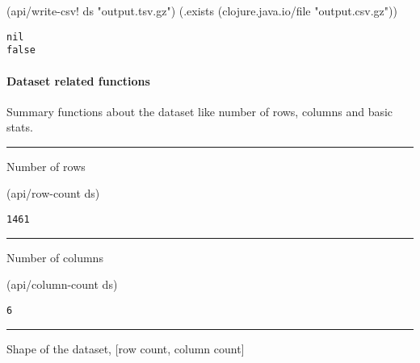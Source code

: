 \documentclass[]{article}
\newenvironment{Shaded}{\begin{snugshade}}{\end{snugshade}}
\newcommand{\StringTok}[1]{\textcolor[rgb]{0.31,0.60,0.02}{#1}}
\newcommand{\NormalTok}[1]{#1}
\let\oldparagraph\paragraph
\renewcommand{\paragraph}[1]{\oldparagraph{#1}\mbox{}}
\begin{document}
\begin{Shaded}
\begin{Highlighting}[]
\NormalTok{(api/write-csv! ds }\StringTok{"output.tsv.gz"}\NormalTok{)}
\NormalTok{(.exists (clojure.java.io/file }\StringTok{"output.csv.gz"}\NormalTok{))}
\end{Highlighting}
\end{Shaded}

\begin{verbatim}
nil
false
\end{verbatim}

\paragraph{Dataset related functions}\label{dataset-related-functions}

Summary functions about the dataset like number of rows, columns and
basic stats.

\begin{center}\rule{0.5\linewidth}{0.5pt}\end{center}

Number of rows

\begin{Shaded}
\begin{Highlighting}[]
\NormalTok{(api/row-count ds)}
\end{Highlighting}
\end{Shaded}

\begin{verbatim}
1461
\end{verbatim}

\begin{center}\rule{0.5\linewidth}{0.5pt}\end{center}

Number of columns

\begin{Shaded}
\begin{Highlighting}[]
\NormalTok{(api/column-count ds)}
\end{Highlighting}
\end{Shaded}

\begin{verbatim}
6
\end{verbatim}

\begin{center}\rule{0.5\linewidth}{0.5pt}\end{center}

Shape of the dataset, {[}row count, column count{]}
\end{document}
